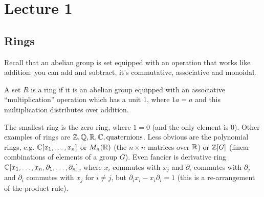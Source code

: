 \section{Lecture 1}

\subsection{Rings}
Recall that an abelian group is set equipped with an operation that works like addition: you can add and subtract, it's commutative,
associative and monoidal.
\begin{definition}
    A set $R$ is a ring if it is an abelian group equipped with an associative ``multiplication'' operation which has a unit $1$, where $1a = a$
    and this multiplication distributes over addition.
\end{definition}
The smallest ring is the zero ring, where $1 = 0$ (and the only element is $0$). Other examples of rings are $\operatorname{\mathbb{Z}}, \operatorname{\mathbb{Q}}, \operatorname{\mathbb{R}}, \operatorname{\mathbb{C}}, \text{quaternions}$.
Less obvious are
the polynomial rings, e.g. $\operatorname{\mathbb{C}}[x_1, \dots, x_n]$ or $M_n(\operatorname{\mathbb{R}})$ (the $n \times n$ matrices over $\operatorname{\mathbb{R}}$) or $\operatorname{\mathbb{Z}}[G]$ (linear combinations of elements of a group $G$).
Even fancier is derivative ring $\operatorname{\mathbb{C}}[x_1, \dots, x_n, \partial_1, \dots, \partial_n]$, where $x_i$ commutes with $x_j$ and $\partial_i$ commutes with
$\partial_j$ and $\partial_i$ commutes with $x_j$ for $i \neq j$, but $\partial_i x_i - x_i \partial_i = 1$ (this is a re-arrangement of the product rule).

